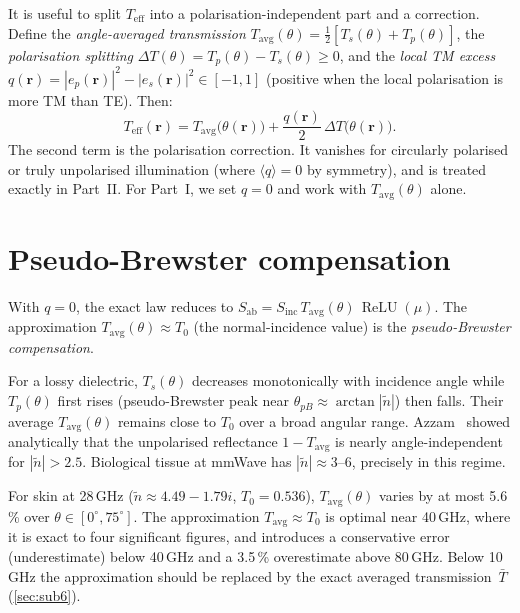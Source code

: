 \documentclass[11pt,a4paper]{article}
\theoremstyle{definition}
\newcommand{\rr}{\mathbf{r}}
\newcommand{\Sinc}{S_{\mathrm{inc}}}
\newcommand{\Sab}{S_{\mathrm{ab}}}
\newcommand{\Teff}{T_{\mathrm{eff}}}
\newcommand{\Tavg}{T_{\mathrm{avg}}}
\newcommand{\ntilde}{\tilde{n}}
\DeclareMathOperator{\ReLU}{ReLU}
\newcommand{\Tbar}{\bar{T}}
\begin{document}
It is useful to split $\Teff$ into a polarisation-independent part and a
correction.  Define the \emph{angle-averaged transmission}
$\Tavg(\theta)=\frac{1}{2}[T_s(\theta)+T_p(\theta)]$, the
\emph{polarisation splitting} $\Delta T(\theta)=T_p(\theta)-T_s(\theta)\ge
0$, and the \emph{local TM excess}
$q(\rr)=|e_p(\rr)|^2-|e_s(\rr)|^2\in[-1,1]$ (positive when the local
polarisation is more TM than TE).  Then:
\begin{equation}\label{eq:Teff-decomp}
  \Teff(\rr) = \Tavg\!\bigl(\theta(\rr)\bigr)
    + \frac{q(\rr)}{2}\,\Delta T\!\bigl(\theta(\rr)\bigr).
\end{equation}
The second term is the polarisation correction.  It vanishes for
circularly polarised or truly unpolarised illumination (where $\langle
q\rangle=0$ by symmetry), and is treated exactly in Part~II.  For
Part~I, we set $q=0$ and work with $\Tavg(\theta)$ alone.

\section{Pseudo-Brewster compensation}\label{sec:pseudo-brewster}

With $q=0$, the exact law reduces to
$\Sab=\Sinc\,\Tavg(\theta)\,\ReLU(\mu)$.  The approximation
$\Tavg(\theta)\approx T_0$ (the normal-incidence value) is the
\emph{pseudo-Brewster compensation}.

For a lossy dielectric, $T_s(\theta)$ decreases monotonically with
incidence angle while $T_p(\theta)$ first rises (pseudo-Brewster peak
near $\theta_{pB}\approx\arctan|\ntilde|$) then falls.  Their average
$\Tavg(\theta)$ remains close to $T_0$ over a broad angular range.
Azzam~\cite{Azzam2015} showed analytically that the unpolarised
reflectance $1-\Tavg$ is nearly angle-independent for $|\ntilde|>2.5$.
Biological tissue at mmWave has $|\ntilde|\approx 3$--6, precisely in
this regime.

For skin at 28\,GHz ($\ntilde\approx 4.49-1.79i$, $T_0=0.536$),
$\Tavg(\theta)$ varies by at most 5.6\,\% over
$\theta\in[0^\circ,75^\circ]$.  The approximation $\Tavg\approx T_0$
is optimal near 40\,GHz, where it is exact to four significant figures,
and introduces a conservative error (underestimate) below 40\,GHz
and a 3.5\,\% overestimate above 80\,GHz.  Below 10\,GHz the
approximation should be replaced by the exact averaged
transmission~$\Tbar$ (\cref{sec:sub6}).
\end{document}
